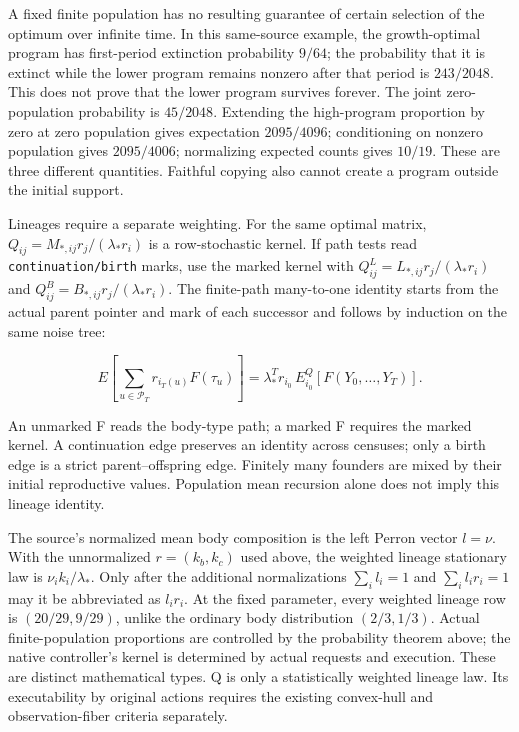 \documentclass[
  english,
  11pt,
  oneside]{book}
\begin{document}
A fixed finite population has no resulting guarantee of certain selection of the optimum over infinite time. In this same-source example, the growth-optimal program has first-period extinction probability \(9/64\); the probability that it is extinct while the lower program remains nonzero after that period is \(243/2048\). This does not prove that the lower program survives forever. The joint zero-population probability is \(45/2048\). Extending the high-program proportion by zero at zero population gives expectation \(2095/4096\); conditioning on nonzero population gives \(2095/4006\); normalizing expected counts gives \(10/19\). These are three different quantities. Faithful copying also cannot create a program outside the initial support.

Lineages require a separate weighting. For the same optimal matrix, \(Q_{ij}=M_{*,ij}r_j/(\lambda_*r_i)\) is a row-stochastic kernel. If path tests read \nolinkurl{continuation/birth} marks, use the marked kernel with \(Q^L_{ij}=L_{*,ij}r_j/(\lambda_*r_i)\) and \(Q^B_{ij}=B_{*,ij}r_j/(\lambda_*r_i)\). The finite-path many-to-one identity starts from the actual parent pointer and mark of each successor and follows by induction on the same noise tree:

\[E\!\left[\sum_{u\in\mathcal P_T}r_{i_T(u)}F(\tau_u)\right]
=\lambda_*^T r_{i_0}\,E^Q_{i_0}[F(Y_0,\ldots,Y_T)].\]

An unmarked F reads the body-type path; a marked F requires the marked kernel. A continuation edge preserves an identity across censuses; only a birth edge is a strict parent--offspring edge. Finitely many founders are mixed by their initial reproductive values. Population mean recursion alone does not imply this lineage identity.

The source's normalized mean body composition is the left Perron vector \(l=\nu\). With the unnormalized \(r=(k_b,k_c)\) used above, the weighted lineage stationary law is \(\nu_i k_i/\lambda_*\). Only after the additional normalizations \(\sum_i l_i=1\) and \(\sum_i l_ir_i=1\) may it be abbreviated as \(l_ir_i\). At the fixed parameter, every weighted lineage row is \((20/29,9/29)\), unlike the ordinary body distribution \((2/3,1/3)\). Actual finite-population proportions are controlled by the probability theorem above; the native controller's kernel is determined by actual requests and execution. These are distinct mathematical types. Q is only a statistically weighted lineage law. Its executability by original actions requires the existing convex-hull and observation-fiber criteria separately.
\end{document}
